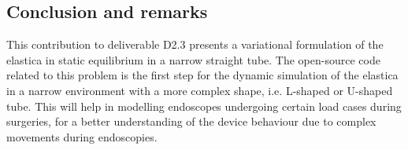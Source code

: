 \subsection{Conclusion and remarks}

This contribution to deliverable D2.3 presents a variational formulation of the elastica in static equilibrium in a narrow straight tube. The open-source code related to this problem is the first step for the dynamic simulation of the elastica in a narrow environment with a more complex shape, i.e. L-shaped or U-shaped tube. This will help in modelling endoscopes undergoing certain load cases during surgeries, for a better understanding of the device behaviour due to complex movements during endoscopies.
